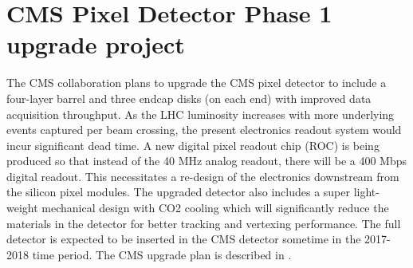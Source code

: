 
\section{CMS Pixel Detector Phase 1 upgrade project}


The CMS collaboration plans to upgrade the CMS pixel detector to
include a four-layer barrel and three endcap disks (on each end) with
improved data acquisition throughput. As the LHC luminosity increases
with more underlying events captured per beam crossing, the present
electronics readout system would incur significant dead time. A new
digital pixel readout chip (ROC) is being produced so that instead of
the 40 MHz analog readout, there will be a 400 Mbps digital
readout. This necessitates a re-design of the electronics downstream
from the silicon pixel modules. The upgraded detector also includes a
super light-weight mechanical design with CO2 cooling which will
significantly reduce the materials in the detector for better tracking
and vertexing performance. The full detector is expected to be
inserted in the CMS detector sometime in the 2017-2018 time
period. The CMS upgrade plan is described in \cite{UpgradeProposal}.

